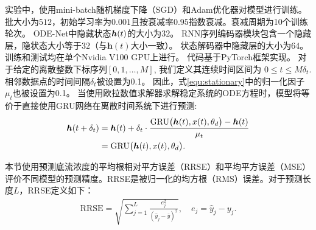 实验中，使用mini-batch随机梯度下降（SGD）和Adam优化器\cite{kingma2014adam}对模型进行训练。
批大小为$512$，初始学习率为$0.001$且按衰减率$0.95$指数衰减。衰减周期为10个训练轮次。
ODE-Net中隐藏状态$\boldsymbol h(t)$的大小为$32$。
RNN序列编码器模块包含一个隐藏层，隐状态大小等于$32$（与$\boldsymbol h(t)$大小一致）。
状态解码器中隐藏层的大小为$64$。
训练和测试均在单个Nvidia V100 GPU上进行。
代码基于PyTorch框架实现。
对于给定的离散整数下标序列$[0,1,\dots, M]$, 我们定义其连续时间区间为 $0\leq t\leq M\delta_t$.
相邻数据点的时间间隔$\delta _t$被设置为0.1。
因此，式\eqref{equ:stationary}中的归一化因子$\mu _t$也被设置为0.1。
当使用欧拉数值求解器求解稳定系统的ODE方程时，模型将等价于直接使用GRU网络在离散时间系统下进行预测:
\begin{align}
    \boldsymbol h(t+\delta _t) &=\boldsymbol h(t) + \delta _t \cdot \frac{\text{GRU}\big(\boldsymbol h(t),x(t), \theta_d \big) - \boldsymbol h(t)}{\mu _t}  \nonumber\\
                      &= \text{GRU}\big(\boldsymbol h(t),x(t), \theta _d\big).
\end{align}

本节使用预测底流浓度的平均根相对平方误差（RRSE）和平均平方误差（MSE）评价不同模型的预测精度。RRSE是被归一化的均方根（RMS）误差。对于预测长度$L$，RRSE定义如下：
\begin{equation}
\begin{aligned}
    \text{RRSE}=\sqrt{\sum_{j=1}^{L} \frac{e_{j}^{2}}{\left(\hat{y}_{j}-\bar{y}\right)^{2}}}, \quad e_{j}=\hat{y}_{j}-y_{j}.
\end{aligned}
\label{equ:rrse}
\end{equation}




